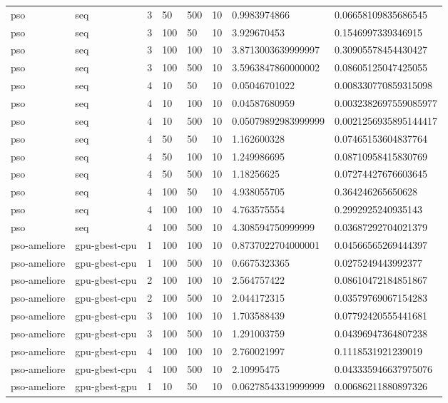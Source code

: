 \begin{table}[t]
\begin{tabular}{llllllll}
pso & seq & 3 & 50 & 500 & 10 & 0.9983974866 & 0.06658109835686545 \\
pso & seq & 3 & 100 & 50 & 10 & 3.929670453 & 0.1546997339346915 \\
pso & seq & 3 & 100 & 100 & 10 & 3.8713003639999997 & 0.30905578454430427 \\
pso & seq & 3 & 100 & 500 & 10 & 3.5963847860000002 & 0.08605125047425055 \\
pso & seq & 4 & 10 & 50 & 10 & 0.05046701022 & 0.008330770859315098 \\
pso & seq & 4 & 10 & 100 & 10 & 0.04587680959 & 0.0032382697559085977 \\
pso & seq & 4 & 10 & 500 & 10 & 0.05079892983999999 & 0.0021256935895144417 \\
pso & seq & 4 & 50 & 50 & 10 & 1.162600328 & 0.07465153604837764 \\
pso & seq & 4 & 50 & 100 & 10 & 1.249986695 & 0.08710958415830769 \\
pso & seq & 4 & 50 & 500 & 10 & 1.18256625 & 0.07274427676603645 \\
pso & seq & 4 & 100 & 50 & 10 & 4.938055705 & 0.364246265650628 \\
pso & seq & 4 & 100 & 100 & 10 & 4.763575554 & 0.2992925240935143 \\
pso & seq & 4 & 100 & 500 & 10 & 4.308594750999999 & 0.03687292704021379 \\
pso-ameliore & gpu-gbest-cpu & 1 & 100 & 100 & 10 & 0.8737022704000001 & 0.04566565269444397 \\
pso-ameliore & gpu-gbest-cpu & 1 & 100 & 500 & 10 & 0.6675323365 & 0.0275249443992377 \\
pso-ameliore & gpu-gbest-cpu & 2 & 100 & 100 & 10 & 2.564757422 & 0.08610472184851867 \\
pso-ameliore & gpu-gbest-cpu & 2 & 100 & 500 & 10 & 2.044172315 & 0.03579769067154283 \\
pso-ameliore & gpu-gbest-cpu & 3 & 100 & 100 & 10 & 1.703588439 & 0.07792420555441681 \\
pso-ameliore & gpu-gbest-cpu & 3 & 100 & 500 & 10 & 1.291003759 & 0.04396947364807238 \\
pso-ameliore & gpu-gbest-cpu & 4 & 100 & 100 & 10 & 2.760021997 & 0.1118531921239019 \\
pso-ameliore & gpu-gbest-cpu & 4 & 100 & 500 & 10 & 2.10995475 & 0.043335946637975076 \\
pso-ameliore & gpu-gbest-gpu & 1 & 10 & 50 & 10 & 0.06278543319999999 & 0.00686211880897326 \\

\end{tabular}
\end{table}
